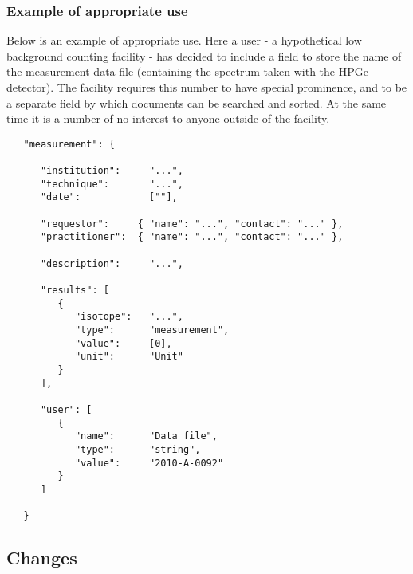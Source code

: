 \documentclass[11pt, letterpaper]{article}
\begin{document}
\newpage

\subsubsection{Example of appropriate use}

\noindent Below is an example of appropriate use. Here a user - a hypothetical low background counting facility - has decided to include a field to store the name of the measurement data file (containing the spectrum taken with the HPGe detector). The facility requires this number to have special prominence, and to be a separate field by which documents can be searched and sorted. At the same time it is a number of no interest to anyone outside of the facility.

\begin{small}
\begin{verbatim}
   "measurement": {
    
      "institution":     "...",
      "technique":       "...",
      "date":            [""],
      
      "requestor":     { "name": "...", "contact": "..." },
      "practitioner":  { "name": "...", "contact": "..." },
               
      "description":     "...",

      "results": [
         {
            "isotope":   "...",
            "type":      "measurement",
            "value":     [0],
            "unit":      "Unit"
         }
      ],

      "user": [
         { 
            "name":      "Data file", 
            "type":      "string",
            "value":     "2010-A-0092" 
         }
      ]
      
   }
\end{verbatim}
\end{small}

\newpage

\subsection{Changes} %
\end{document}
